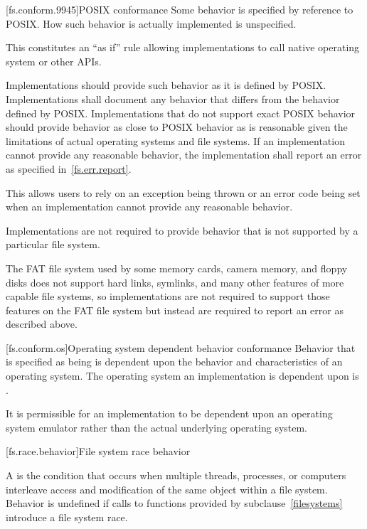 [fs.conform.9945]{POSIX conformance}
\pnum
Some behavior is specified by reference to POSIX. How such behavior is actually implemented is unspecified.
\begin{note}
This constitutes an ``as if'' rule allowing implementations
to call native
operating system or other APIs.
\end{note}

\pnum
Implementations should provide such behavior as it is defined by
POSIX\@. Implementations shall document any behavior that differs from the
behavior defined by POSIX\@. Implementations that do not support exact POSIX
behavior should provide behavior as close to POSIX behavior as is reasonable given the
limitations of actual operating systems and file systems. If an implementation cannot provide any
reasonable behavior, the implementation shall report an error as specified in~\ref{fs.err.report}.
\begin{note}
This allows users to rely on an exception being thrown or
an error code being set when an implementation cannot provide any reasonable
behavior.
\end{note}

\pnum
Implementations are not required to provide behavior that is not supported by
a particular file system.
\begin{example}
The FAT file system used by some memory cards, camera memory, and
floppy disks does not support hard links, symlinks, and many other features of
more capable file systems, so implementations are not required to support those
features on the FAT file system
but instead are required to report an error as described above.
\end{example}

[fs.conform.os]{Operating system dependent behavior conformance}
\pnum
Behavior that is specified as being
is dependent upon the behavior
and characteristics of an operating system.
The operating system an
implementation is dependent upon is
.

\pnum
It is permissible for an implementation to be dependent upon an operating
system emulator rather than the actual underlying operating system.

[fs.race.behavior]{File system race behavior}

\pnum
A  is
the condition that occurs
when multiple threads, processes, or computers interleave access and
modification of
the same object within a file system.
Behavior is undefined if calls to functions provided by subclause~\ref{filesystems} introduce a file system race.

